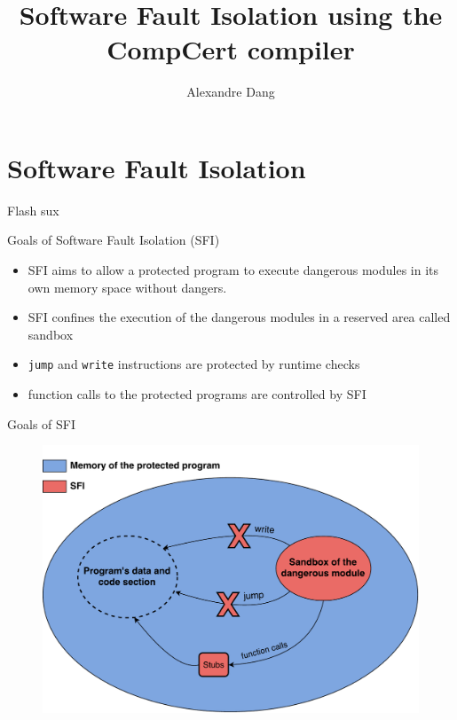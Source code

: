 \documentclass{beamer}
\title{Software Fault Isolation using the CompCert compiler}
\author{Alexandre Dang}
\institute{Team Celtique}
\begin{document}
\frame{\titlepage}
 

\section{Software Fault Isolation}
\label{sec:Software Fault Isolation}

\begin{frame}[c]{Flash sux}
\end{frame}

\begin{frame}{Goals of Software Fault Isolation (SFI)}
	\begin{itemize}
		\item SFI aims to allow a protected program to execute dangerous modules in its own memory space without dangers. 
		\item SFI confines the execution of the dangerous modules in a reserved area called sandbox
		\item \texttt{jump} and \texttt{write} instructions are protected by runtime checks
		\item function calls to the protected programs are controlled by SFI
	\end{itemize}
\end{frame}

\begin{frame}[c]{Goals of SFI}
\begin{figure}
\centering
\includegraphics[width=1\textwidth]{images/sfi_principle.pdf}
\end{figure}

\end{frame}
\end{document}
